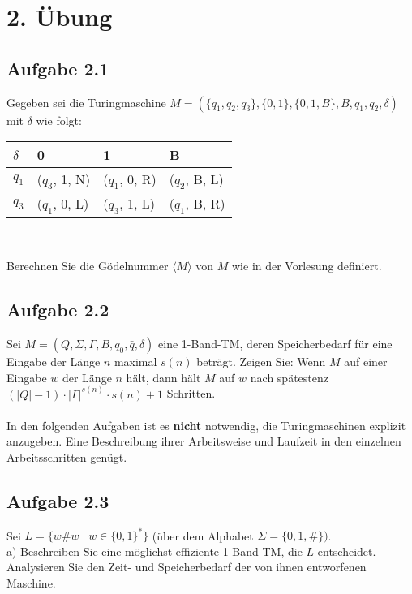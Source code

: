 \section*{2. Übung}
\subsection*{Aufgabe 2.1}
Gegeben sei die Turingmaschine $M=(\{q_1, q_2, q_3\}, \{0,1\}, \{0,1,B\}, B, q_1, q_2, \delta)$ mit $\delta$ wie folgt:
\begin{center}
	\begin{tabular}{l|lll}
		$\delta$ & \hspace{0.6cm}0 & \hspace{0.6cm}1 & \hspace{0.6cm}B \\ \hline
		$q_1$ & ($q_3$, 1, N) & ($q_1$, 0, R) & ($q_2$, B, L) \\
		$q_3$ & ($q_1$, 0, L) & ($q_3$, 1, L) & ($q_1$, B, R)
	\end{tabular}\\
\end{center}
Berechnen Sie die Gödelnummer $\langle M \rangle$ von $M$ wie in der Vorlesung definiert.

\subsection*{Aufgabe 2.2}
Sei $M = (Q, \Sigma, \Gamma, B, q_0, \bar{q}, \delta)$ eine 1-Band-TM, deren Speicherbedarf für eine Eingabe der Länge $n$ maximal $s(n)$ beträgt. Zeigen Sie: Wenn $M$ auf einer Eingabe $w$ der Länge $n$ hält, dann hält $M$ auf $w$ nach spätestenz $(\left| Q\right| -1) \cdot \left| \Gamma\right|^{s(n)} \cdot s(n)+1$ Schritten.\\\\

In den folgenden Aufgaben ist es \textbf{nicht} notwendig, die Turingmaschinen explizit anzugeben. Eine Beschreibung ihrer Arbeitsweise und Laufzeit in den einzelnen Arbeitsschritten genügt.

\subsection*{Aufgabe 2.3}
Sei $L=\{w\#w \mid w \in \{0,1\}^*\}$ (über dem Alphabet $\Sigma = \{0,1,\#\})$.\\
a) Beschreiben Sie eine möglichst effiziente 1-Band-TM, die $L$ entscheidet. Analysieren Sie den Zeit- und Speicherbedarf der von ihnen entworfenen Maschine.\\\\

